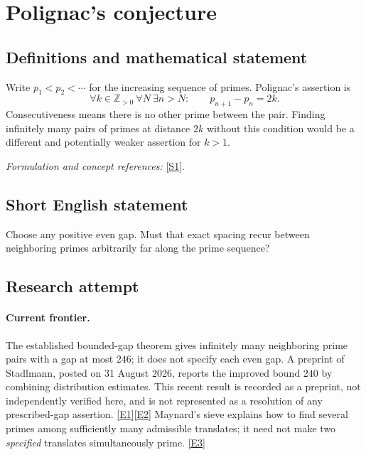 \documentclass[11pt,a4paper]{article}
\newcommand{\Z}{\mathbb{Z}}
\newcommand{\sref}[2]{\hyperlink{source:#1:#2}{[S#2]}}
\newcommand{\eref}[2]{\hyperlink{extra:#1:#2}{[E#2]}}
\newif\ifshowcatalogue
\newcommand{\cataloguescope}[1]{\ifshowcatalogue
 \paragraph{Exact scope in the supplied catalogue.}
 \begin{quote}\small #1\end{quote}\fi}
\numberwithin{equation}{section}
\begin{document}
\setcounter{section}{105}
\clearpage
\section{\texorpdfstring{Polignac's conjecture}{Polignac's conjecture}}\label{106}
\subsection{Definitions and mathematical statement}
Write $p_1<p_2<\cdots$ for the increasing sequence of primes. Polignac's assertion is
\[
 \forall k\in\Z_{>0}\ \forall N\ \exists n>N:\qquad p_{n+1}-p_n=2k.
\]
Consecutiveness means there is no other prime between the pair. Finding infinitely many pairs of primes at distance $2k$ without this condition would be a different and potentially weaker assertion for $k>1$.
\par\smallskip\textit{Formulation and concept references:} \sref{106}{1}.
\cataloguescope{For every positive even integer 2k, there are infinitely many pairs of consecutive primes whose difference is 2k.}
\subsection{Short English statement}
Choose any positive even gap. Must that exact spacing recur between neighboring primes arbitrarily far along the prime sequence?
\subsection{Research attempt}

\paragraph{Current frontier.}
The established bounded-gap theorem gives infinitely many neighboring prime
pairs with a gap at most $246$; it does not specify each even gap. A preprint
of Stadlmann, posted on 31 August 2026, reports the improved bound $240$ by
combining distribution estimates. This recent result is recorded as a
preprint, not independently verified here, and is not represented as a
resolution of any prescribed-gap assertion. \eref{106}{1}\eref{106}{2}
Maynard's sieve explains how to find several primes among sufficiently many
admissible translates; it need not make two \emph{specified} translates
simultaneously prime. \eref{106}{3}
\end{document}
